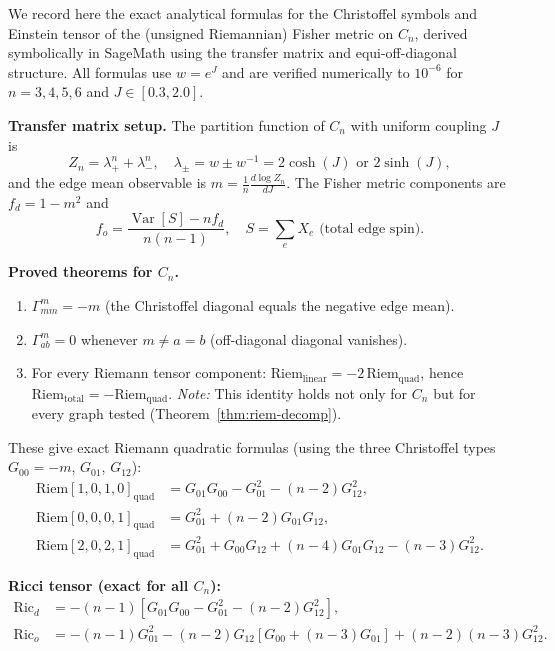 \documentclass[11pt]{article}
\theoremstyle{definition}
\theoremstyle{remark}
\newcommand{\Var}{\operatorname{Var}}
\begin{document}
We record here the exact analytical formulas for the Christoffel symbols
and Einstein tensor of the (unsigned Riemannian) Fisher metric on $C_n$,
derived symbolically in SageMath using the transfer matrix and equi-off-diagonal
structure. All formulas use $w = e^J$ and are verified numerically to $10^{-6}$
for $n = 3, 4, 5, 6$ and $J \in [0.3, 2.0]$.

\textbf{Transfer matrix setup.} The partition function of $C_n$ with uniform
coupling $J$ is
\begin{equation}
  Z_n = \lambda_+^n + \lambda_-^n, \quad
  \lambda_\pm = w \pm w^{-1} = 2\cosh(J) \text{ or } 2\sinh(J),
\end{equation}
and the edge mean observable is $m = \frac{1}{n}\frac{d\log Z_n}{dJ}$.
The Fisher metric components are $f_d = 1 - m^2$ and
\begin{equation}
  f_o = \frac{\Var[S] - n f_d}{n(n-1)}, \quad
  S = \sum_{e} X_e \text{ (total edge spin)}.
\end{equation}

\textbf{Proved theorems for $C_n$.}
\begin{enumerate}
  \item $\Gamma^m_{mm} = -m$ (the Christoffel diagonal equals the negative edge mean).
  \item $\Gamma^m_{ab} = 0$ whenever $m \neq a = b$ (off-diagonal diagonal vanishes).
  \item For every Riemann tensor component: $\text{Riem}_\text{linear} = -2\,\text{Riem}_\text{quad}$,
        hence $\text{Riem}_\text{total} = -\text{Riem}_\text{quad}$.
        \emph{Note:} This identity holds not only for $C_n$ but for every graph
        tested (Theorem~\ref{thm:riem-decomp}).
\end{enumerate}

These give exact Riemann quadratic formulas (using the three Christoffel types
$G_{00} = -m$, $G_{01}$, $G_{12}$):
\begin{align}
  \text{Riem}[1,0,1,0]_\text{quad} &= G_{01} G_{00} - G_{01}^2 - (n-2)G_{12}^2, \\
  \text{Riem}[0,0,0,1]_\text{quad} &= G_{01}^2 + (n-2)G_{01}G_{12}, \\
  \text{Riem}[2,0,2,1]_\text{quad} &= G_{01}^2 + G_{00}G_{12} + (n-4)G_{01}G_{12} - (n-3)G_{12}^2.
\end{align}

\textbf{Ricci tensor (exact for all $C_n$):}
\begin{align}
  \text{Ric}_d &= -(n-1)[G_{01}G_{00} - G_{01}^2 - (n-2)G_{12}^2], \\
  \text{Ric}_o &= -(n-1)G_{01}^2 - (n-2)G_{12}[G_{00} + (n-3)G_{01}] + (n-2)(n-3)G_{12}^2.
\end{align}
\end{document}
